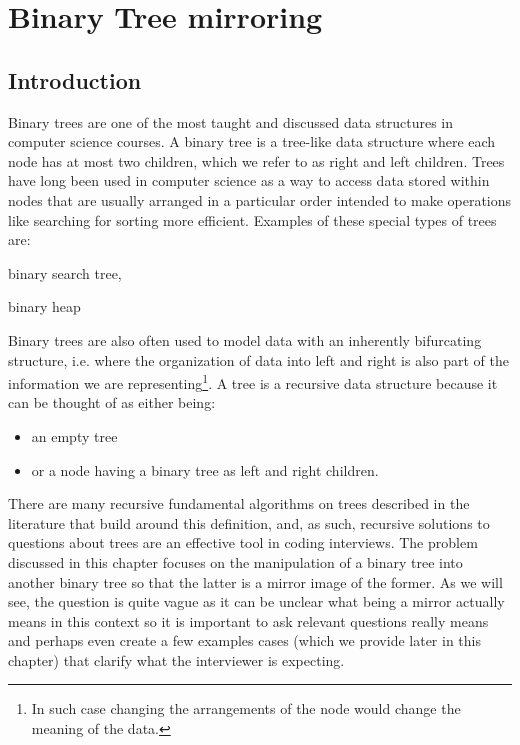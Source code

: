 %

\chapter{Binary Tree mirroring}
\label{ch:mirror_binary_tree}
\section*{Introduction}
Binary trees are one of the most taught and discussed data structures in computer science courses. A
binary tree is a tree-like data structure where each node has at most two children, which we refer
to as right and left children. Trees have long been used in computer science as a way to 
access data stored within nodes that are usually arranged in a particular order intended to make 
operations like searching for sorting more efficient. Examples of these special
types of trees are: 
\begin{itemize*}
	\item binary search tree,
	\item binary heap
\end{itemize*}

Binary trees are also often used to model data with an inherently bifurcating structure, i.e. where
the organization of data into left and right is also part of the information we are representing\footnote{In such
case changing the arrangements of the node would change the meaning of the data.}.
A tree is a recursive data structure because it can be thought of as either being:
\begin{itemize}
	\item an empty tree
	\item or a node having a binary tree as left and right children.
\end{itemize}
There are many recursive fundamental algorithms on trees described in the literature that build around this definition, 
and, as such,  recursive solutions to questions about trees are an effective tool in coding interviews.
The problem discussed in this chapter focuses on the manipulation of a binary tree into another binary tree
so that the latter is a mirror image of the former. As we will see,  the question is quite vague as it can be unclear what being a mirror actually means in this context so it is important to ask relevant questions really means and perhaps even create a few examples cases (which we provide later in this chapter) that clarify what the interviewer is expecting. 

